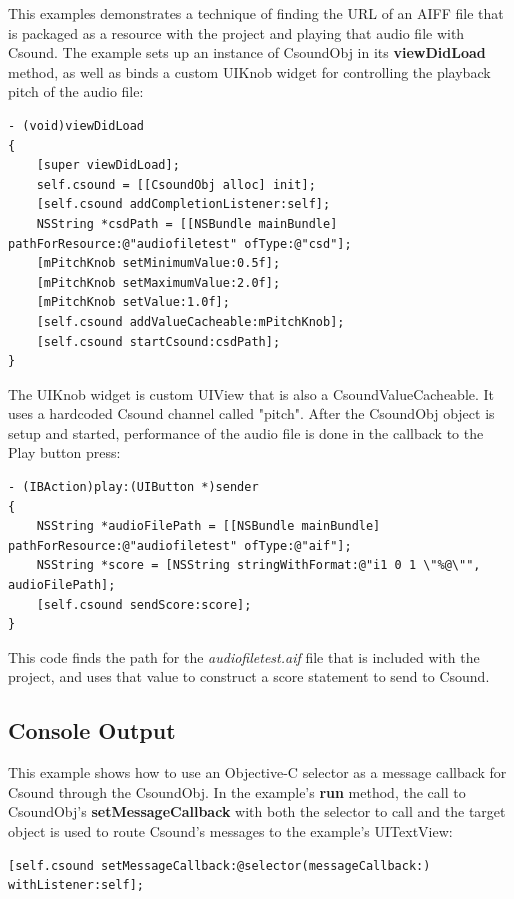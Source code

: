 \documentclass[11pt]{article}
\begin{document}
This examples demonstrates a technique of finding the URL of an AIFF file that is packaged as a resource with the project and playing that audio file with Csound.  The example sets up an instance of CsoundObj in its \textbf{viewDidLoad} method, as well as binds a custom UIKnob widget for controlling the playback pitch of the audio file:

\begin{lstlisting}[caption=CsoundObj setup code]
- (void)viewDidLoad
{
    [super viewDidLoad];
    self.csound = [[CsoundObj alloc] init];
    [self.csound addCompletionListener:self];
    NSString *csdPath = [[NSBundle mainBundle] pathForResource:@"audiofiletest" ofType:@"csd"];
    [mPitchKnob setMinimumValue:0.5f];
    [mPitchKnob setMaximumValue:2.0f];
    [mPitchKnob setValue:1.0f];
    [self.csound addValueCacheable:mPitchKnob];
    [self.csound startCsound:csdPath];
}
\end{lstlisting}

The UIKnob widget is custom UIView that is also a CsoundValueCacheable.  It uses a hardcoded Csound channel called "pitch".  After the CsoundObj object is setup and started, performance of the audio file is done in the callback to the Play button press:

\begin{lstlisting}[caption=Play button callback code]
- (IBAction)play:(UIButton *)sender
{
    NSString *audioFilePath = [[NSBundle mainBundle] pathForResource:@"audiofiletest" ofType:@"aif"];
    NSString *score = [NSString stringWithFormat:@"i1 0 1 \"%@\"", audioFilePath];
    [self.csound sendScore:score];
}
\end{lstlisting}

This code finds the path for the \emph{audiofiletest.aif} file that is included with the project, and uses that value to construct a score statement to send to Csound. 

\subsection{Console Output}

This example shows how to use an Objective-C selector as a message callback for Csound through the CsoundObj.  In the example's \textbf{run} method, the call to CsoundObj's \textbf{setMessageCallback} with both the selector to call and the target object is used to route Csound's messages to the example's UITextView:

\begin{lstlisting}[caption=Example of setting message callback]
    [self.csound setMessageCallback:@selector(messageCallback:) withListener:self];
\end{lstlisting}
\end{document}
